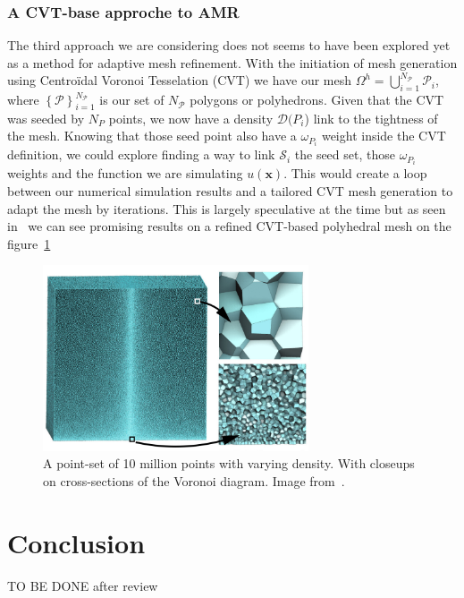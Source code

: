 \documentclass{article}
\begin{document}
\subsubsection{A CVT-base approche to AMR}
The third approach we are considering does not seems to have been explored yet as a method for adaptive mesh refinement. With the initiation of mesh generation using Centroïdal Voronoi Tesselation (CVT) we have our mesh $\Omega^h =  \bigcup\limits_{i=1}^{N_{\mathcal{P}}}  \mathcal{P}_i $, where $\left\{\mathcal{P} \right\}{_{i=1}^{N_{\mathcal{P}}}}$ is our set of $N_{\mathcal{P}}$ polygons or polyhedrons. Given that the CVT was seeded by ${N}_P$ points, we now have a density $\mathcal{D}({P}_i$) link to the tightness of the mesh. Knowing that those seed point also have a $\omega_{P_i}$ weight inside the CVT definition, we could explore finding a way to link $\mathcal{S}_i$ the seed set, those $\omega_{P_i}$ weights and the function we are simulating $u(\mathbf{x})$. This would create a loop between our numerical simulation results and a tailored CVT mesh generation to adapt the mesh by iterations. This is largely speculative at the time but as seen in~\cite{voroGPU} we can see promising results on a refined CVT-based polyhedral mesh on the figure~\ref{fig:voroGPU}

\begin{figure}[htbp]
\centering
\includegraphics[width=0.7\textwidth]{./Images/voroGPU}
\caption{\label{fig:voroGPU} A point-set of 10 million points with varying density. With closeups on cross-sections of the Voronoi diagram. Image from~\cite{voroGPU}.}
\end{figure}

\section{Conclusion}

TO BE DONE after review



\end{document}
